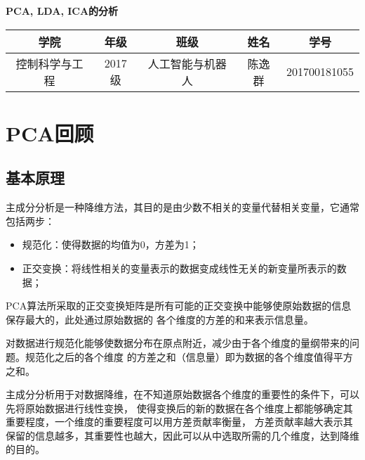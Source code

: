 \documentclass{article}
\begin{document}
\begin{center}
    \textbf{PCA, LDA, ICA的分析}
\end{center}

\begin{center}
\begin{tabular}{c c c c c}
    \hline \hline
    学院 & 年级 & 班级 & 姓名 & 学号 \\
    \hline
    控制科学与工程 & 2017级 & 人工智能与机器人 & 陈逸群 & 201700181055 \\
    \hline \hline
\end{tabular}
\end{center}
\tableofcontents
\newpage

\section{PCA回顾}
\subsection{基本原理}
主成分分析是一种降维方法，其目的是由少数不相关的变量代替相关变量，它通常包括两步：
\begin{itemize}
    \item 规范化：使得数据的均值为0，方差为1；
    \item 正交变换：将线性相关的变量表示的数据变成线性无关的新变量所表示的数据；
\end{itemize}
PCA算法所采取的正交变换矩阵是所有可能的正交变换中能够使原始数据的信息保存最大的，此处通过原始数据的
各个维度的方差的和来表示信息量。

对数据进行规范化能够使数据分布在原点附近，减少由于各个维度的量纲带来的问题。规范化之后的各个维度
的方差之和（信息量）即为数据的各个维度值得平方之和。

主成分分析用于对数据降维，在不知道原始数据各个维度的重要性的条件下，可以先将原始数据进行线性变换，
使得变换后的新的数据在各个维度上都能够确定其重要程度，一个维度的重要程度可以用方差贡献率衡量，
方差贡献率越大表示其保留的信息越多，其重要性也越大，因此可以从中选取所需的几个维度，达到降维的目的。
\end{document}
